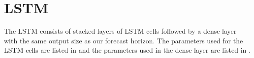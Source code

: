 \section{LSTM}
\label{section:Method:LSTM}




The LSTM consists of stacked layers of LSTM cells followed by a
dense layer with the same output size as our forecast horizon.
The parameters used for the LSTM cells are listed in 
and the parameters used in the dense layer are listed in .

